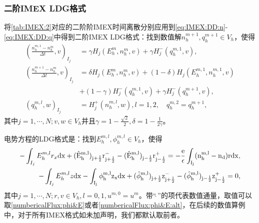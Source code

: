 \subsubsection{二阶IMEX LDG格式}


将\autoref{tab:IMEX:2}对应的二阶阶IMEX时间离散分别应用到\eqref{eq:IMEX:DD:n}-\eqref{eq:IMEX:DD:q}中得到二阶IMEX LDG格式：找到数值解$n_h^{m+1},q_h^{m+1}\in V_h$，使得
\begin{align}
	(\frac{n_h^{m,1} -n_h^m}{\Delta t},v)_{I_j} & = \gamma H_j(E_h^m,n_h^m,v) + \gamma H_j^-(q_h^{m,1},v),              \label{eq:IMEX:2:first} \\
	(\frac{n_h^{m+1} -n_h^m}{\Delta t},v)_{I_j} & = \delta H_j(E_h^m,n_h^m,v) + (1-\delta)H_j(E_h^{m,1},n_h^{m,1},v) \nonumber                  \\
	                                            & +(1-\gamma)H_j^-(q_h^{m,1},v) + \gamma H_j^-(q_h^{m+1},v),                                    \\
	(q_h^{m,l},w)_{I_j}                         & = H_j^+(n_h^{m,l},w), l = 1,2, \quad q_h^{m,2} = q_h^{m+1},
\end{align}
其中$j = 1,\cdots,N; v,w \in V_h$并且$\gamma = 1- \frac{\sqrt{2}}{2},\delta = 1 - \frac{1}{2\gamma}$。

电势方程的LDG格式是：找到$E_h^{m,l},\phi_h^{m,l} \in V_h$，使得
\begin{align}
	-\int_{I_j} E_h^{m,l}r_x \rm{d}x + (\hat{E}_h^{m,l})_{j+\frac{1}{2}}r_{j+\frac{1}{2}}^- - (\hat{E}_h^{m,l})_{j-\frac{1}{2}}r_{j-\frac{1}{2}}^+ = -\frac{e}{\epsilon}\int_{I_j}(n_h^{m,l} - n_d) r\rm{d} x, \\
	-\int_{I_j} E_h^{m,l}z \rm{d}x - \int_{I_j} \phi_h^{m,l}z_x \rm{d}x  + (\hat{\phi}_h^{m,l})_{j+\frac{1}{2}}z^-_{j+\frac{1}{2}} - (\hat{\phi}_h^{m,l})_{j-\frac{1}{2}}z_{j-\frac{1}{2}}^+  = 0, \label{eq:IMEX:2:last}
\end{align}
其中$j = 1,\cdots,N; r,v \in V_h, l = 0,1, u^{m,0} = u^m$。带“$\widehat{\ }$”的项代表数值通量，取值可以取\eqref{numbericalFlux:phi&E}或者\eqref{numbericalFlux:phi&E:alt}，在后续的数值算例中，对于所有IMEX格式如未加声明，我们都默认取前者。

